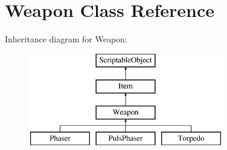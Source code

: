 \hypertarget{class_weapon}{}\section{Weapon Class Reference}
\label{class_weapon}
Inheritance diagram for Weapon\+:\begin{figure}[H]
\begin{center}
\leavevmode
\includegraphics[height=4.000000cm]{class_weapon}
\end{center}
\end{figure}
